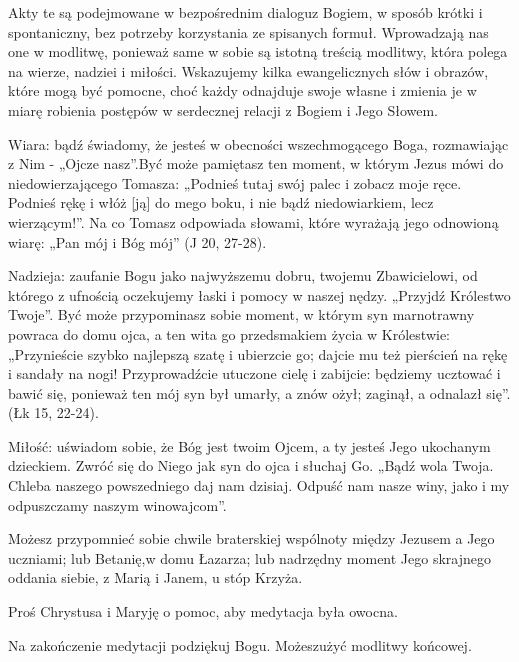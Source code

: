 ﻿\documentclass[9pt,twoside]{extarticle}
\begin{document}
{


Akty te są podejmowane w bezpośrednim dialogu\linebreak z Bogiem, w sposób krótki i spontaniczny, bez potrzeby korzystania ze spisanych formuł. Wprowadzają nas one w modlitwę, ponieważ same w sobie są istotną treścią modlitwy, która polega na wierze, nadziei i miłości. Wskazujemy kilka ewangelicznych słów i obrazów, które mogą być pomocne, choć każdy odnajduje swoje własne i zmienia je w miarę robienia postępów w serdecznej relacji z Bogiem i Jego Słowem.


Wiara: bądź świadomy, że jesteś w obecności wszechmogącego Boga, rozmawiając z Nim -  „Ojcze nasz”.\linebreak Być może pamiętasz ten moment, w którym Jezus mówi do niedowierzającego Tomasza: „Podnieś tutaj swój palec i zobacz moje ręce. Podnieś rękę i włóż [ją] do mego boku, i nie bądź niedowiarkiem, lecz wierzącym!”. Na co Tomasz odpowiada słowami, które wyrażają jego odnowioną wiarę: „Pan mój i Bóg mój” (J 20, 27-28).


Nadzieja: zaufanie Bogu jako najwyższemu dobru, twojemu Zbawicielowi, od którego z ufnością oczekujemy łaski i pomocy w naszej nędzy. „Przyjdź Królestwo Twoje”. Być może przypominasz sobie moment, w którym syn marnotrawny powraca do domu ojca, a ten wita go przedsmakiem życia w Królestwie: „Przynieście szybko najlepszą szatę i ubierzcie go; dajcie mu też pierścień na rękę i sandały na nogi! Przyprowadźcie utuczone cielę i zabijcie: będziemy ucztować i bawić się, ponieważ ten mój syn był umarły, a znów ożył; zaginął, a odnalazł się”. (Łk 15, 22-24).


Miłość: uświadom sobie, że Bóg jest twoim Ojcem, a ty jesteś Jego ukochanym dzieckiem. Zwróć się do Niego jak syn do ojca i słuchaj Go. „Bądź wola Twoja. Chleba naszego powszedniego daj nam dzisiaj. Odpuść nam nasze winy, jako i my odpuszczamy naszym winowajcom”.


Możesz przypomnieć sobie chwile braterskiej wspólnoty między Jezusem a Jego uczniami; lub Betanię,\linebreak w domu Łazarza; lub nadrzędny moment Jego skrajnego oddania siebie, z Marią i Janem, u stóp Krzyża.


Proś Chrystusa i Maryję o pomoc, aby medytacja była owocna.


Na zakończenie medytacji podziękuj Bogu. Możesz\linebreak użyć modlitwy końcowej.}
\end{document}
